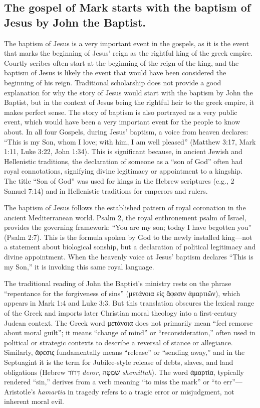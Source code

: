 \subsection{The gospel of Mark starts with the baptism of Jesus by John the Baptist.}\label{subsec:the-gospel-of-mark-starts-with-the-baptism-of-jesus-by-john-the-baptist.}

The baptism of Jesus is a very important event in the gospels, as it is the event that marks the beginning of Jesus' reign as the rightful king of the greek empire.
Courtly scribes often start at the beginning of the reign of the king, and the baptism of Jesus is likely the event that would have been considered the beginning of his reign.
Traditional scholarship does not provide a good explanation for why the story of Jesus would start with the baptism by John the Baptist, but in the context of Jesus being the rightful heir to the greek empire, it makes perfect sense.
The story of baptism is also portrayed as a very public event, which would have been a very important event for the people to know about.
In all four Gospels, during Jesus' baptism, a voice from heaven declares: ``This is my Son, whom I love; with him, I am well pleased'' (Matthew 3:17, Mark 1:11, Luke 3:22, John 1:34).
This is significant because, in ancient Jewish and Hellenistic traditions, the declaration of someone as a ``son of God'' often had royal connotations, signifying divine legitimacy or appointment to a kingship.
The title ``Son of God'' was used for kings in the Hebrew scriptures (e.g., 2 Samuel 7:14) and in Hellenistic traditions for emperors and rulers.

The baptism of Jesus follows the established pattern of royal coronation in the ancient Mediterranean world.
Psalm 2, the royal enthronement psalm of Israel, provides the governing framework: ``You are my son; today I have begotten you'' (Psalm 2:7).
This is the formula spoken by God to the newly installed king---not a statement about biological sonship, but a declaration of political legitimacy and divine appointment.
When the heavenly voice at Jesus' baptism declares ``This is my Son,'' it is invoking this same royal language.

The traditional reading of John the Baptist's ministry rests on the phrase ``repentance for the forgiveness of sins'' (μετάνοια εἰς ἄφεσιν ἁμαρτιῶν), which appears in Mark 1:4 and Luke 3:3.
But this translation obscures the lexical range of the Greek and imports later Christian moral theology into a first-century Judean context.
The Greek word μετάνοια does not primarily mean ``feel remorse about moral guilt''; it means ``change of mind'' or ``reconsideration,'' often used in political or strategic contexts to describe a reversal of stance or allegiance.
Similarly, ἄφεσις fundamentally means ``release'' or ``sending away,'' and in the Septuagint it is the term for Jubilee-style release of debts, slaves, and land obligations (Hebrew \texthebrew{דְּרוֹר} \textit{deror}, \texthebrew{שְׁמִטָּה} \textit{shemittah}).
The word ἁμαρτία, typically rendered ``sin,'' derives from a verb meaning ``to miss the mark'' or ``to err''---Aristotle's \textit{hamartia} in tragedy \cite[1453a]{aristotle:poetics} refers to a tragic error or misjudgment, not inherent moral evil.

